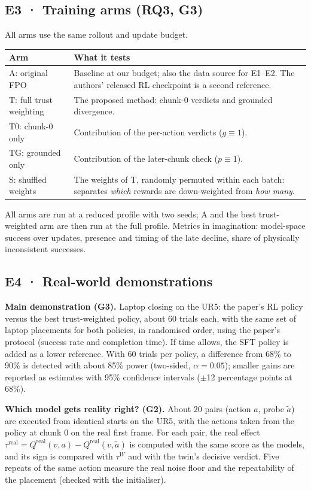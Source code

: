 \documentclass[11pt,a4paper]{article}
\theoremstyle{plain}
\theoremstyle{definition}
\theoremstyle{remark}
\begin{document}
\subsection{E3 · Training arms (RQ3, G3)}
All arms use the same rollout and update budget.
\begin{center}\small
\begin{tabularx}{\linewidth}{@{}lX@{}}
\toprule
\textbf{Arm} & \textbf{What it tests}\\
\midrule
A: original FPO & Baseline at our budget; also the data source for E1--E2. The authors' released RL checkpoint is a second reference.\\
T: full trust weighting & The proposed method: chunk-0 verdicts and grounded divergence.\\
T0: chunk-0 only & Contribution of the per-action verdicts ($g\equiv1$).\\
TG: grounded only & Contribution of the later-chunk check ($p\equiv1$).\\
S: shuffled weights & The weights of T, randomly permuted within each batch: separates \emph{which} rewards are down-weighted from \emph{how many}.\\
\bottomrule
\end{tabularx}
\end{center}
All arms are run at a reduced profile with two seeds; A and the best trust-weighted arm are then run at the full profile. Metrics in imagination: model-space success over updates, presence and timing of the late decline, share of physically inconsistent successes.

\subsection{E4 · Real-world demonstrations}\label{sec:exp-real}
\textbf{Main demonstration (G3).} Laptop closing on the UR5: the paper's RL policy versus the best trust-weighted policy, about 60 trials each, with the same set of laptop placements for both policies, in randomised order, using the paper's protocol (success rate and completion time). If time allows, the SFT policy is added as a lower reference. With 60 trials per policy, a difference from 68\% to 90\% is detected with about 85\% power (two-sided, $\alpha=0.05$); smaller gains are reported as estimates with 95\% confidence intervals ($\pm$12 percentage points at 68\%).

\textbf{Which model gets reality right? (G2).} About 20 pairs (action $a$, probe $\tilde a$) are executed from identical starts on the UR5, with the actions taken from the policy at chunk 0 on the real first frame. For each pair, the real effect $\tau^{\mathrm{real}}=Q^{\mathrm{real}}(v,a)-Q^{\mathrm{real}}(v,\tilde a)$ is computed with the same score as the models, and its sign is compared with $\tau^W$ and with the twin's decisive verdict. Five repeats of the same action measure the real noise floor and the repeatability of the placement (checked with the initialiser).
\end{document}
